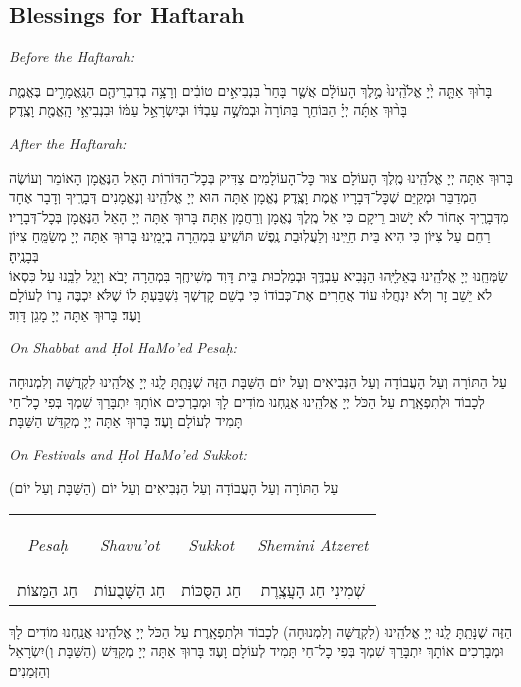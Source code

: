 \documentclass[11pt, openany]{article}
\newcommand{\englishinst}[1]{
	\begin{minipage}{\textwidth}
		\begin{english}\raggedright\centering
			\textit{#1}
				
				\vspace{2pt}
		\end{english}
	\end{minipage}
}
\newcommand{\eng}[1]{\begin{english}\beginL #1 \endL\end{english}}
\newcommand{\enginline}[1]{
\begin{large}
	\eng{\textit{#1}}
\end{large}
}
\begin{document}
\begin{minipage}{\textwidth}
\eng{\section*{Blessings for Haftarah}}

\begin{large}
\englishinst{Before the Haftarah:}
בָּר֙וּךְ אַתָּ֤ה יְ֙יָ אֱלֹ֙הֵֽינוּ֙ מֶ֣לֶךְ הָעוֹלָ֔ם אֲשֶׁ֤ר בָּחַר֙ בִּנְבִיאִ֣ים טוֹבִ֔ים וְרָצָ֥ה בְדִבְרֵיהֶ֖ם הַנֶּֽאֱמָרִ֣ים בֶּאֱמֶ֑ת בָּר֨וּךְ אַתָּ֜ה יְיָ֗ הַבּוֹחֵר֚ בַּתּוֹרָה֙ וּבְמֹשֶׁ֣ה עַבְדּ֔וֹ וּבְיִשְׂרָאֵ֣ל עַמּ֔וֹ וּבִנְבִיאֵ֥י הָֽאֱמֶ֖ת וָצֶֽדֶק׃\\

\englishinst{After the Haftarah:}
בָּרוּךְ אַתָּה יְיָ אֱלֹהֵֽינוּ מֶֽלֶךְ הָעוֹלָם צוּר כׇּל־הָעוֹלָמִים צַדִּיק בְּכׇל־הַדּוֹרוֹת הָאֵל הַנֶּאֱמָן הָאוֹמֵר וְעוֹשֶׂה הַמְדַבֵּר וּמְקַיֵּם שֶׁכׇּל־דְּבָרָיו אֱמֶת וָצֶֽדֶק׃ נֶאֱמָן אַתָּה הוּא יְיָ אֱלֹהֵֽינוּ וְנֶאֱמָנִים דְּבָרֶֽיךָ וְדָבָר אֶחָד מִדְּבָרֶֽיךָ אָחוֹר לֹא יָשׁוּב רֵיקָם כִּי אֵל מֶֽלֶךְ נֶאֱמָן וְרַחֲמָן אַֽתָּה׃ בָּרוּךְ אַתָּה יְיָ הָאֵל הַנֶּאֱמָן בְּכׇל־דְּבָרָיו׃\\
רַחֵם עַל צִיּוֹן כִּי הִיא בֵּית חַיֵּֽינוּ וְלַעֲלֽוּבַת נֶֽפֶשׁ תּוֹשִֽׁיעַ בִּמְהֵרָה בְיָמֵֽינוּ׃ בָּרוּךְ אַתָּה יְיָ מְשַׂמֵּֽחַ צִיּוֹן בְּבָנֶֽיהָ׃\\
שַׂמְּחֵֽנוּ יְיָ אֱלֹהֵֽינוּ בְּאֵלִיָּֽהוּ הַנָּבִיא עַבְדֶּֽךָ וּבְמַלְכוּת בֵּית דָּוִד מְשִׁיחֶֽךָ בִּמְהֵרָה יָבֹא וְיָגֵל לִבֵּֽנוּ עַל כִּסְאוֹ לֹא יֵשֵׁב זָר וְלֹא יִנְחֲלוּ עוֹד אֲחֵרִים אֶת־כְּבוֹדוֹ כִּי בְשֵׁם קׇדְשְׁךָ נִשְׁבַּעְתָּ לוֹ שֶׁלֹּא יִכְבֶּה נֵרוֹ לְעוֹלָם וָעֶד׃ בָּרוּךְ אַתָּה יְיָ מָגֵן דָּוִד׃\\

\englishinst{On Shabbat and \d{H}ol HaMo'ed Pesa\d{h}:}
עַל הַתּוֹרָה וְעַל הָעֲבוֹדָה וְעַל הַנְּבִיאִים וְעַל יוֹם הַשַּׁבָּת הַזֶּה שֶׁנָּתַֽתָּ לָֽנוּ יְיָ אֱלֹהֵֽינוּ לִקְדֻשָּׁה וְלִמְנוּחָה לְכָבוֹד וּלְתִפְאָֽרֶת׃ עַל הַכֹּל יְיָ אֱלֹהֵֽינוּ אֲנַֽחְנוּ מוֹדִים לָךְ וּמְבָרְכִים אוֹתָךְ יִתְבָּרַךְ שִׁמְךָ בְּפִי כׇל־חַי תָּמִיד לְעוֹלָם וָעֶד׃ בָּרוּךְ אַתָּה יְיָ מְקַדֵּשׁ הַשַּׁבָּת׃\\

\englishinst{On Festivals and \d{H}ol HaMo'ed Sukkot:}
עַל הַתּוֹרָה וְעַל הָעֲבוֹדָה וְעַל הַנְּבִיאִים וְעַל יוֹם (הַשַּׁבָּת וְעַל יוֹם)\\
	
\begin{tabular}{c | c | c | c}

\enginline{Pesa\d{h}}&\enginline{Shavu'ot}&\enginline{Sukkot}&\enginline{Shemini Atzeret}\\	
			חַג הַמַּצּוֹת & חַג הַשָּׁבֻעוֹת & חַג הַסֻּכּוֹת & שְׁמִינִי חַג הָעֲצֶֽרֶת\\ 
\end{tabular}

	הַזֶּה שֶׁנָּתַֽתָּ לָֽנוּ יְיָ אֱלֹהֵֽינוּ (לִקְדֻשָּׁה וְלִמְנוּחָה) לְכָבוֹד וּלְתִפְאָֽרֶת׃ עַל הַכֹּל יְיָ אֱלֹהֵֽינוּ אֲנַֽחְנוּ מוֹדִים לָךְ וּמְבָרְכִים אוֹתָךְ יִתְבָּרַךְ שִׁמְךָ בְּפִי כׇל־חַי תָּמִיד לְעוֹלָם וָעֶד׃ בָּרוּךְ אַתָּה יְיָ מְקַדֵּשׁ (הַשַּׁבָּת וְ)יִשְׂרָאֵל וְהַזְּמַנִים׃
\end{large}\end{minipage}
\end{document}
